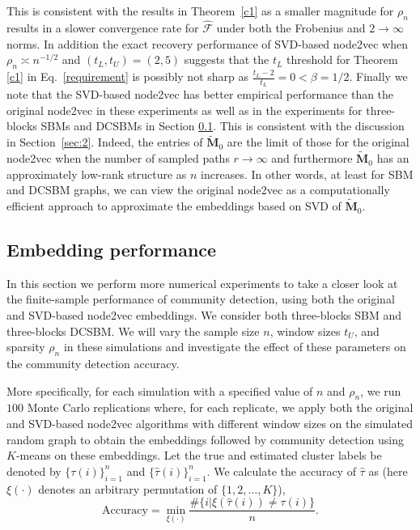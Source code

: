 \documentclass[10pt,journal,compsoc]{IEEEtran}
\newcommand{\bds}{\boldsymbol}
\numberwithin{equation}{section}
\begin{document}
This is consistent with the results in Theorem~\ref{c1} as a smaller magnitude for $\rho_n$ results in a slower convergence rate for $\hat{\bds{\mathcal{F}}}$ under both the Frobenius and $2\rightarrow  \infty$ norms. In addition the exact recovery performance of SVD-based node2vec when $\rho_n\asymp n^{-1/2}$ and $(t_L,t_U ) = (2,5)$ suggests that the $t_L$ threshold for Theorem \ref{c1} in  Eq.~\eqref{requirement} is possibly not sharp as $\frac{t_L - 2}{t_L} = 0 < \beta = 1/2$.{ \color{black} Finally we note that the SVD-based node2vec has better empirical performance than the original node2vec in these experiments as well as in the experiments for three-blocks SBMs and DCSBMs in Section \ref{sec_simulation_embedding}. This is consistent with the discussion in Section~\ref{sec:2}. Indeed, the entries of $\tilde{\mathbf{M}}_0$ are the limit of those for the original node2vec when the number of sampled paths $r \rightarrow \infty$ and furthermore $\tilde{\mathbf{M}}_0$ has an approximately low-rank structure as $n$ increases. In other words, at least for SBM and DCSBM graphs, we can view the original node2vec as a computationally efficient approach to approximate the embeddings based on SVD of $\tilde{\mathbf{M}}_0$. 
}



\subsection{Embedding performance}\label{sec_simulation_embedding}
In this section we perform more numerical experiments to take a closer look at the
finite-sample performance of community detection, using both the original and SVD-based node2vec embeddings.
We consider both three-blocks SBM and three-blocks DCSBM. We will vary the sample size $n$,
window sizes $t_U$, and sparsity $\rho_n$ in these simulations
and investigate the effect of these parameters on the community detection accuracy.

More specifically, for each simulation with a specified value of $n$
and $\rho_n$, we run $100$ Monte Carlo replications where, for each
replicate, we apply both the original and SVD-based node2vec algorithms with different window
sizes on the simulated random graph to obtain the
embeddings followed by community detection using $K$-means on these
embeddings. Let the true and estimated cluster labels be denoted by $\{\tau(i)\}_{i
= 1}^n$ and
$\{\hat{\tau}(i)\}_{i = 1}^n$. We calculate the accuracy of $\hat{\tau}$ as (here
$\xi(\cdot)$ denotes an arbitrary permutation of $\{1,2,\dots,K\}$),
\begin{equation}\label{def:acc}
  \text{Accuracy} =
\min_{\xi(\cdot)}\frac{\#\{i|\xi(\hat{\tau}(i))\neq \tau(i)\}}{n}.
\end{equation}
\end{document}
